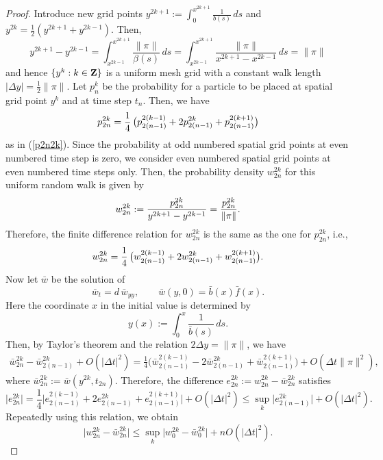 \documentclass[11pt]{amsart}
\def\d{d}
\def\Z{{\bf Z}}
\begin{document}
\begin{proof}
Introduce new grid points $y^{2k+1}:=\int_0^{x^{2k+1}} \frac{1}{b(s)}\,ds$ and $y^{2k}=\frac{1}{2}(y^{2k+1}+y^{2k-1})$. Then,
\[
y^{2k+1}-y^{2k-1} =\int_{x^{2k-1}}^{x^{2k+1}}\frac{\|\pi\|}{\beta(s)}\,ds =\int_{x^{2k-1}}^{x^{2k+1}}\frac{\|\pi\|}{x^{2k+1}-x^{2k-1}}\,ds  =\|\pi\|
\]
and hence $\{y^k:k\in\Z\}$ is a uniform mesh grid with a constant walk length $|\Delta y|=\frac{1}{2}\|\pi\|$. Let $p_n^k$ be the probability for a particle to be placed at spatial grid point $y^k$ and at time step $t_n$. Then, we have
\[
p^{2k}_{2n} ={1\over 4}\, \big( p^{2(k-1)}_{2(n-1)} +2p^{2k}_{2(n-1)} +p^{2(k+1)}_{2(n-1)} \big)
\]
as in (\ref{p2n2k}). Since the probability at odd numbered spatial grid points at even numbered time step is zero, we consider even numbered spatial grid points at even numbered time steps only. Then, the probability density $w^{2k}_{2n}$ for this uniform random walk is given by
\[
w^{2k}_{2n}:={p^{2k}_{2n}\over y^{2k+1}-y^{2k-1}} = \frac{p^{2k}_{2n}}{ \|\pi\| }.
\]
Therefore, the finite difference relation for $w^{2k}_{2n}$ is the same as the one for $p^{2k}_{2n}$, i.e.,
\[
w^{2k}_{2n} ={1\over 4}\, \big( w^{2(k-1)}_{2(n-1)} +2w^{2k}_{2(n-1)} +w^{2(k+1)}_{2(n-1)} \big).
\]
Now let $\bar w$ be the solution of
\begin{equation} \label{barw}
\bar w_t =\d\,\bar w_{yy},\qquad\bar w(y,0) =\bar b(x)\bar f(x).
\end{equation}
Here the coordinate $x$ in the initial value is determined by
\begin{equation} \label{relation-y(x)}
y(x):=\int_0^x \frac{1}{\bar b(s)}\,ds.
\end{equation}
Then, by Taylor's theorem and the relation $2\Delta y=\|\pi\|$, we have
\[\begin{split}
\bar{w}^{2k}_{2n} -\bar{w}^{2k}_{2(n-1)} +O(|\Delta t|^2)
=\frac{1}{4} \big( \bar{w}^{2(k-1)}_{2(n-1)} -2\bar{w}^{2k}_{2(n-1)} + \bar{w}^{2(k+1)}_{2(n-1)} \big) +O(\Delta t\|\pi\|^{2}),
\end{split}\]
where $\bar{w}^{2k}_{2n}:=\bar{w}(y^{2k},t_{2n})$. Therefore, the difference $e^{2k}_{2n}:=w^{2k}_{2n}-\bar{w}^{2k}_{2n}$ satisfies
\[
\big| e^{2k}_{2n} \big| = \frac{1}{4} \big| e^{2(k-1)}_{2(n-1)} +2e^{2k}_{2(n-1)} +e^{2(k+1)}_{2(n-1)} \big| +O(|\Delta t|^2)\leq \sup_k \big| e^{2k}_{2(n-1)} \big| + O(|\Delta t|^2).
\]
Repeatedly using this relation, we obtain
\begin{equation} \label{error-between-w's}
\big| w^{2k}_{2n}-\bar{w}^{2k}_{2n} \big| \leq \sup_k \big| w^{2k}_0-\bar{w}^{2k}_0 \big| + nO(|\Delta t|^2).
\end{equation}


\end{proof}
\end{document}

